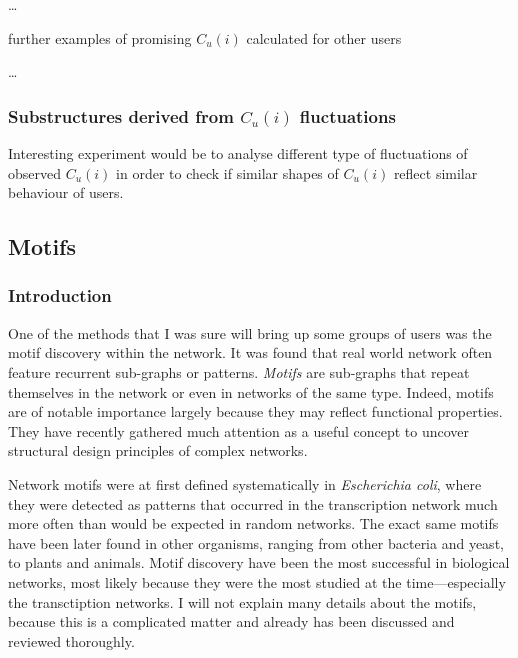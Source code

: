       \ldots
      
      further examples of promising $C_u(i)$ calculated for other users
      
      \ldots
      
    \subsubsection{Substructures derived from $C_u(i)$ fluctuations}
    
      Interesting experiment would be to analyse different type of fluctuations of observed $C_u(i)$ in order to check if similar shapes of $C_u(i)$ reflect similar behaviour of users.

  \subsection{Motifs}
  
    \subsubsection{Introduction}
      
      One of the methods that I was sure will bring up some groups of users was the motif discovery within the network. It was found that real world network often feature recurrent sub-graphs or patterns. \emph{Motifs} are sub-graphs that repeat themselves in the network or even in networks of the same type. Indeed, motifs are of notable importance largely because they may reflect functional properties. They have recently gathered much attention as a useful concept to uncover structural design principles of complex networks.\cite{MasoudiSchreiberKashani2012}
      
      Network motifs were at first defined systematically in \emph{Escherichia coli}, where they were detected as patterns that occurred in the transcription network much more often than would be expected in random networks.\cite{MiloAlon2002} The exact same motifs have been later found in other organisms, ranging from other bacteria\cite{ManganZaslaverAlon2003,Eichenberger2004} and yeast\cite{MiloAlon2002, Lee2002}, to plants\cite{Saddic2006} and animals\cite{Boyer2005}. Motif discovery have been the most successful in biological networks, most likely because they were the most studied at the time---especially the transctiption networks. I will not explain many details about the motifs, because this is a complicated matter and already has been discussed and reviewed thoroughly.\cite{Alon2007}
      
